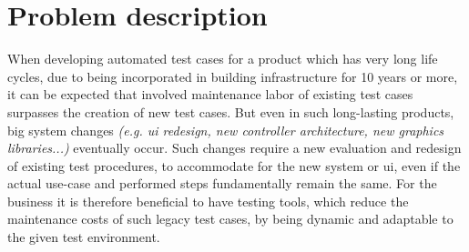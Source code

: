 \documentclass[Bachelor, BIC, english, fhCitStyle, IEEE]{BASE/twbook} %
\begin{document}
\chapter{Problem description}
When developing automated test cases for a product which has very long life cycles, due to being incorporated in building infrastructure for 10 years or more, it can be expected that involved maintenance labor of existing test cases surpasses the creation of new test cases. But even in such long-lasting products, big system changes \textit{(e.g. \ac{ui} redesign, new controller architecture, new graphics libraries...)} eventually occur. Such changes require a new evaluation and redesign of existing test procedures, to accommodate for the new system or \ac{ui}, even if the actual use-case and performed steps fundamentally remain the same.
For the business it is therefore beneficial to have testing tools, which reduce the maintenance costs of such legacy test cases, by being dynamic and adaptable to the given test environment.\\
\end{document}
